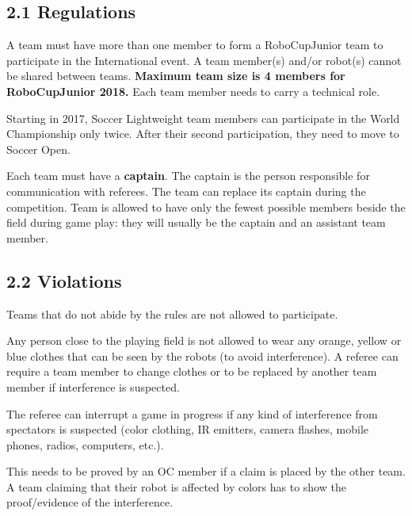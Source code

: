\documentclass{article}
\begin{document}
\subsection{2.1 Regulations \label{ref-016}}

A team \textcolor{color-5}{must} have more than one member to form a RoboCupJunior team to participate in the International event. A team member(s) and/or robot(s) cannot be shared between teams. \textbf{\textcolor{color-5}{Maximum team size is 4 members for RoboCupJunior 2018.}} \textcolor{color-5}{Each team member needs to carry a technical role.}

\textcolor{color-5}{Starting in 2017, Soccer Lightweight team members can participate in the World Championship only twice. After their second participation, they need to move to Soccer Open.} 

Each team must have a \textbf{captain}. The captain is the person responsible for communication with referees. The team can replace its captain during the competition. Team is allowed to have only the fewest possible members beside the field during game play: they will usually be the captain and an assistant team member.

\subsection{2.2 Violations \label{ref-017}}

Teams that do not abide by the rules are not allowed to participate.

 

Any person close to the playing field is not allowed to wear any orange, yellow or blue clothes that can be seen by the robots (to avoid interference). A referee can require a team member to change clothes or to be replaced by another team member if interference is suspected. 

The referee can interrupt a game in progress if any kind of interference from spectators is suspected (color clothing, IR emitters, camera flashes, mobile phones, radios, computers, etc.).

This needs to be proved by an OC member if a claim is placed by the other team. A team claiming that their robot is affected by colors has to show the proof/evidence of the interference.
\end{document}
